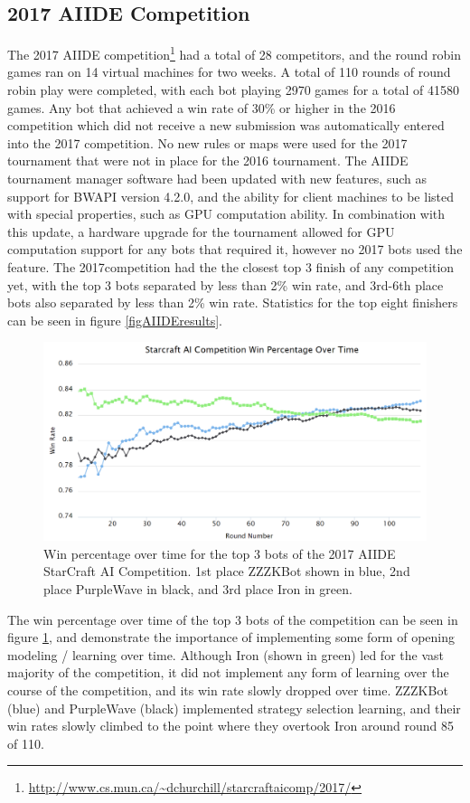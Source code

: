 \subsection{2017 AIIDE Competition}\label{subsecAIIDEnews}

The 2017 AIIDE competition\footnote{\url{http://www.cs.mun.ca/~dchurchill/starcraftaicomp/2017/}} had a total of 28 competitors, and the round robin games ran on 14 virtual machines for two weeks. A total of 110 rounds of round robin play were completed, with each bot playing 2970 games for a total of 41580 games. Any bot that achieved a win rate of 30\% or higher in the 2016 competition which did not receive a new submission was automatically entered into the 2017 competition. No new rules or maps were used for the 2017 tournament that were not in place for the 2016 tournament. The AIIDE tournament manager software had been updated with new features, such as support for BWAPI version 4.2.0, and the ability for client machines to be listed with special properties, such as GPU computation ability. In combination with this update, a hardware upgrade for the tournament allowed for GPU computation support for any bots that required it, however no 2017 bots used the feature. The 2017competition had the the closest top 3 finish of any competition yet, with the top 3 bots separated by less than 2\% win rate, and 3rd-6th place bots also separated by less than 2\% win rate. Statistics for the top eight finishers can be seen in figure \ref{figAIIDEresults}.

\begin{figure}[t]
  \centering
  \includegraphics[width=1\columnwidth]{fig/aiideWinPerc.png}
  \caption{Win percentage over time for the top 3 bots of the 2017 AIIDE StarCraft AI Competition. 1st place ZZZKBot shown in blue, 2nd place PurpleWave in black, and 3rd place Iron in green. }
  \label{aiideWinPerc}
\end{figure}

The win percentage over time of the top 3 bots of the competition can be seen in figure \ref{aiideWinPerc}, and demonstrate the importance of implementing some form of opening modeling / learning over time. Although Iron (shown in green) led for the vast majority of the competition, it did not implement any form of learning over the course of the competition, and its win rate slowly dropped over time. ZZZKBot (blue) and PurpleWave (black) implemented strategy selection learning, and their win rates slowly climbed to the point where they overtook Iron around round 85 of 110. 